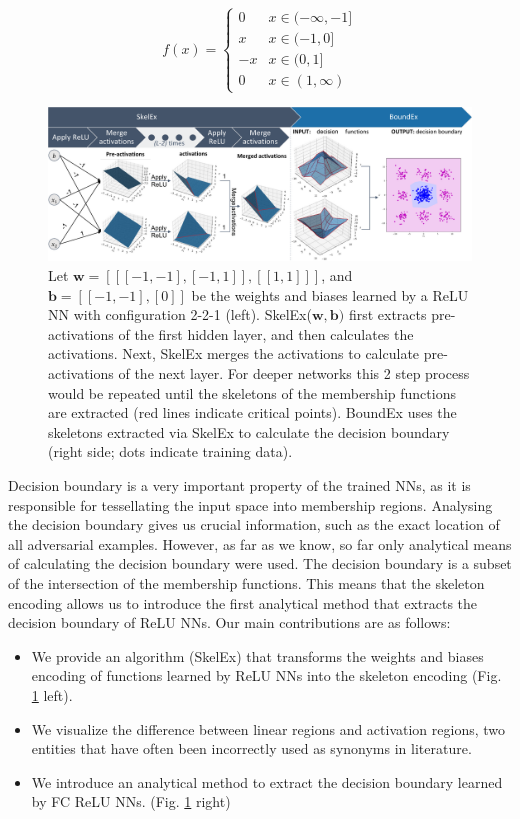 \documentclass{article}
\begin{document}
\begin{equation} \label{eq:2}
    f(x) =
    \begin{cases}
        0   & x \in (-\infty, -1]\\
        x   & x \in (-1, 0]\\
        -x  & x \in (0, 1]\\
        0   & x \in (1, \infty) 
    \end{cases}
\end{equation}

\begin{figure}[t]
    \centering
    \includegraphics[width=17.8cm]{Latex Template/Figures/poster.pdf}
    \caption{Let $\mathbf{w}=[[[-1, -1], [-1, 1]], [[1, 1]]]$, and $\mathbf{b} = [[-1, -1], [0]]$ be the weights and biases learned by a ReLU NN with configuration 2-2-1 (left). SkelEx($\mathbf{w}, \mathbf{b})$ first extracts pre-activations of the first hidden layer, and then calculates the activations. Next, SkelEx merges the activations to calculate pre-activations of the next layer. For deeper networks this 2 step process would be repeated until the skeletons of the membership functions are extracted (red lines indicate critical points). BoundEx uses the skeletons extracted via SkelEx to calculate the decision boundary (right side; dots indicate training data).}
    \label{fig:poster}
\end{figure}

Decision boundary is a very important property of the trained NNs, as it is responsible for tessellating the input space into membership regions. Analysing the decision boundary gives us crucial information, such as the exact location of all adversarial examples. However, as far as we know, so far only analytical means of calculating the decision boundary were used. The decision boundary is a subset of the intersection of the membership functions. This means that the skeleton encoding allows us to introduce the first analytical method that extracts the decision boundary of ReLU NNs. Our main contributions are as follows:
\begin{itemize}
    \item We provide an algorithm (SkelEx) that transforms the weights and biases encoding of functions learned by ReLU NNs into the skeleton encoding (Fig. \ref{fig:poster} left).
    \item We visualize the difference between linear regions and activation regions, two entities that have often been incorrectly used as synonyms in literature.
    \item We introduce an analytical method to extract the decision boundary learned by FC ReLU NNs. (Fig. \ref{fig:poster} right)
\end{itemize}
\end{document}
